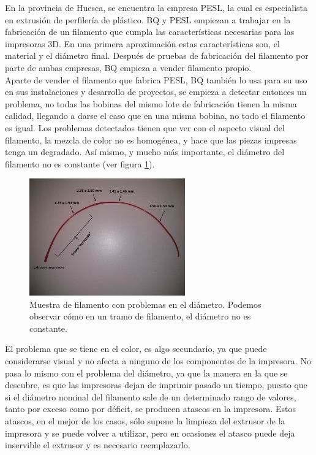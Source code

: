 En la provincia de Huesca, se encuentra la empresa PESL, la cual es especialista en extrusión de perfilería de plástico. BQ y PESL empiezan a trabajar en la fabricación de un filamento que cumpla las características necesarias para las impresoras 3D. En una primera aproximación estas características son, el material y el diámetro final. Después de pruebas de fabricación del filamento por parte de ambas empresas, BQ empieza a vender filamento propio.\\

Aparte de vender el filamento que fabrica PESL, BQ también lo usa para su uso en sus instalaciones y desarrollo de proyectos, se empieza a detectar entonces un problema, no todas las bobinas del mismo lote de fabricación tienen la misma calidad, llegando a darse el caso que en una misma bobina, no todo el filamento es igual. Los problemas detectados tienen que ver con el aspecto visual del filamento, la mezcla de color no es homogénea, y hace que las piezas impresas tenga un degradado. Así mismo, y mucho más importante, el diámetro del filamento no es constante (ver figura \ref{fig:muestra_filamento}).

\begin{figure}[H]
    \centering
    \includegraphics[width=0.6\textwidth]{images/atasco_rojo.jpg}
    \caption[Muestra de filamento con problemas en el diámetro]{Muestra de filamento con problemas en el diámetro. Podemos observar cómo en un tramo de filamento, el diámetro no es constante.}
    \label{fig:muestra_filamento}
\end{figure}

El problema que se tiene en el color, es algo secundario, ya que puede considerarse visual y no afecta a ninguno de los componentes de la impresora. No pasa lo mismo con el problema del diámetro, ya que la manera en la que se descubre, es que las impresoras dejan de imprimir pasado un tiempo, puesto que si el diámetro nominal del filamento sale de un determinado rango de valores, tanto por exceso como por déficit, se producen atascos en la impresora. Estos atascos, en el mejor de los casos, sólo supone la limpieza del extrusor de la impresora y se puede volver a utilizar, pero en ocasiones el atasco puede deja inservible el extrusor y es necesario reemplazarlo.\\

